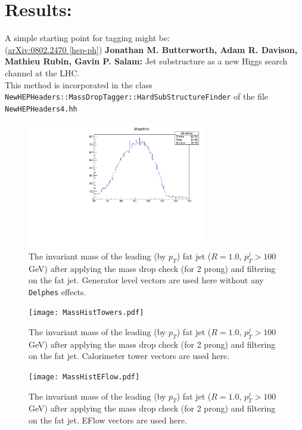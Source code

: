 \section{Results:}

A simple starting point for tagging might be:\\
(\href{https://arxiv.org/pdf/0802.2470.pdf}{arXiv:0802.2470 [hep-ph]}) {\bf Jonathan M. Butterworth, Adam R. Davison, Mathieu Rubin, Gavin P. Salam:} Jet substructure as a new Higgs search channel at the LHC.\\
This method is incorporated in the class {\tt NewHEPHeaders::MassDropTagger::HardSubStructureFinder} of the file {\tt NewHEPHeaders4.hh}

\begin{figure}
	\begin{center}
		\includegraphics[width=0.7\textwidth]{MassDropTaggerResult.pdf}
		\caption{
			The invariant mass of the leading (by $p_T$) fat jet ($R=1.0$, $p_T^{j}>100$ GeV) after applying the mass drop check (for 2 prong) and filtering on the fat jet. Generator level vectors are used here without any {\tt Delphes} effects.
		}
	\end{center}
\end{figure}

\begin{figure}
	\begin{center}
		\texttt{[image: MassHistTowers.pdf]}
		\caption{
			The invariant mass of the leading (by $p_T$) fat jet ($R=1.0$, $p_T^{j}>100$ GeV) after applying the mass drop check (for 2 prong) and filtering on the fat jet. Calorimeter tower vectors are used here.
		}
	\end{center}
\end{figure}

\begin{figure}
	\begin{center}
		\texttt{[image: MassHistEFlow.pdf]}
		\caption{
			The invariant mass of the leading (by $p_T$) fat jet ($R=1.0$, $p_T^{j}>100$ GeV) after applying the mass drop check (for 2 prong) and filtering on the fat jet. EFlow vectors are used here.
		}
	\end{center}
\end{figure}

